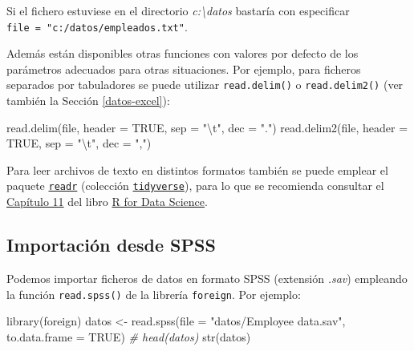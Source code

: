 \documentclass[
]{book}
\newenvironment{Shaded}{\begin{snugshade}}{\end{snugshade}}
\newcommand{\AttributeTok}[1]{\textcolor[rgb]{0.77,0.63,0.00}{#1}}
\newcommand{\CommentTok}[1]{\textcolor[rgb]{0.56,0.35,0.01}{\textit{#1}}}
\newcommand{\ConstantTok}[1]{\textcolor[rgb]{0.00,0.00,0.00}{#1}}
\newcommand{\FunctionTok}[1]{\textcolor[rgb]{0.00,0.00,0.00}{#1}}
\newcommand{\NormalTok}[1]{#1}
\newcommand{\OtherTok}[1]{\textcolor[rgb]{0.56,0.35,0.01}{#1}}
\newcommand{\SpecialCharTok}[1]{\textcolor[rgb]{0.00,0.00,0.00}{#1}}
\newcommand{\StringTok}[1]{\textcolor[rgb]{0.31,0.60,0.02}{#1}}
\theoremstyle{break}
\theoremstyle{nonumberplain}
\begin{document}
Si el fichero estuviese en el directorio \emph{c:\textbackslash datos} bastaría con especificar
\texttt{file\ =\ "c:/datos/empleados.txt"}.

Además están disponibles otras funciones con valores por defecto de los parámetros adecuados para otras situaciones.
Por ejemplo, para ficheros separados por tabuladores se puede utilizar \texttt{read.delim()} o \texttt{read.delim2()} (ver también la Sección \ref{datos-excel}):

\begin{Shaded}
\begin{Highlighting}[]
\FunctionTok{read.delim}\NormalTok{(file, }\AttributeTok{header =} \ConstantTok{TRUE}\NormalTok{, }\AttributeTok{sep =} \StringTok{"}\SpecialCharTok{\textbackslash{}t}\StringTok{"}\NormalTok{, }\AttributeTok{dec =} \StringTok{"."}\NormalTok{)}
\FunctionTok{read.delim2}\NormalTok{(file, }\AttributeTok{header =} \ConstantTok{TRUE}\NormalTok{, }\AttributeTok{sep =} \StringTok{"}\SpecialCharTok{\textbackslash{}t}\StringTok{"}\NormalTok{, }\AttributeTok{dec =} \StringTok{","}\NormalTok{)}
\end{Highlighting}
\end{Shaded}

Para leer archivos de texto en distintos formatos también se puede emplear el paquete \href{https://readr.tidyverse.org}{\texttt{readr}}
(colección \href{https://www.tidyverse.org/}{\texttt{tidyverse}}), para lo que se recomienda
consultar el \href{https://r4ds.had.co.nz/data-import.html}{Capítulo 11} del libro \href{http://r4ds.had.co.nz}{R for Data Science}.

\hypertarget{importaciuxf3n-desde-spss}{%
\subsection{Importación desde SPSS}\label{importaciuxf3n-desde-spss}}

Podemos importar ficheros de datos en formato SPSS (extensión \emph{.sav}) empleando la función \texttt{read.spss()} de la librería \texttt{foreign}.
Por ejemplo:

\begin{Shaded}
\begin{Highlighting}[]
\FunctionTok{library}\NormalTok{(foreign)}
\NormalTok{datos }\OtherTok{\textless{}{-}} \FunctionTok{read.spss}\NormalTok{(}\AttributeTok{file =} \StringTok{"datos/Employee data.sav"}\NormalTok{, }\AttributeTok{to.data.frame =} \ConstantTok{TRUE}\NormalTok{)}
\CommentTok{\# head(datos)}
\FunctionTok{str}\NormalTok{(datos)}
\end{Highlighting}
\end{Shaded}
\end{document}
